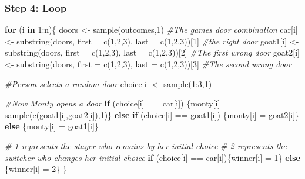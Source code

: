 \documentclass[
]{book}
\newenvironment{Shaded}{\begin{snugshade}}{\end{snugshade}}
\newcommand{\AttributeTok}[1]{\textcolor[rgb]{0.77,0.63,0.00}{#1}}
\newcommand{\CommentTok}[1]{\textcolor[rgb]{0.56,0.35,0.01}{\textit{#1}}}
\newcommand{\ControlFlowTok}[1]{\textcolor[rgb]{0.13,0.29,0.53}{\textbf{#1}}}
\newcommand{\DecValTok}[1]{\textcolor[rgb]{0.00,0.00,0.81}{#1}}
\newcommand{\FunctionTok}[1]{\textcolor[rgb]{0.00,0.00,0.00}{#1}}
\newcommand{\NormalTok}[1]{#1}
\newcommand{\OtherTok}[1]{\textcolor[rgb]{0.56,0.35,0.01}{#1}}
\newcommand{\SpecialCharTok}[1]{\textcolor[rgb]{0.00,0.00,0.00}{#1}}
\theoremstyle{definition}
\theoremstyle{definition}
\theoremstyle{definition}
\theoremstyle{definition}
\theoremstyle{remark}
\begin{document}
\hypertarget{step-4-loop}{%
\subsubsection*{Step 4: Loop}\label{step-4-loop}}

\begin{Shaded}
\begin{Highlighting}[]
\ControlFlowTok{for}\NormalTok{ (i }\ControlFlowTok{in} \DecValTok{1}\SpecialCharTok{:}\NormalTok{n)\{}
\NormalTok{  doors }\OtherTok{\textless{}{-}} \FunctionTok{sample}\NormalTok{(outcomes,}\DecValTok{1}\NormalTok{) }\CommentTok{\#The game\textquotesingle{}s door combination}
\NormalTok{  car[i] }\OtherTok{\textless{}{-}} \FunctionTok{substring}\NormalTok{(doors, }\AttributeTok{first =} \FunctionTok{c}\NormalTok{(}\DecValTok{1}\NormalTok{,}\DecValTok{2}\NormalTok{,}\DecValTok{3}\NormalTok{), }\AttributeTok{last =} \FunctionTok{c}\NormalTok{(}\DecValTok{1}\NormalTok{,}\DecValTok{2}\NormalTok{,}\DecValTok{3}\NormalTok{))[}\DecValTok{1}\NormalTok{] }\CommentTok{\#the right door}
\NormalTok{  goat1[i] }\OtherTok{\textless{}{-}} \FunctionTok{substring}\NormalTok{(doors, }\AttributeTok{first =} \FunctionTok{c}\NormalTok{(}\DecValTok{1}\NormalTok{,}\DecValTok{2}\NormalTok{,}\DecValTok{3}\NormalTok{), }\AttributeTok{last =} \FunctionTok{c}\NormalTok{(}\DecValTok{1}\NormalTok{,}\DecValTok{2}\NormalTok{,}\DecValTok{3}\NormalTok{))[}\DecValTok{2}\NormalTok{] }\CommentTok{\#The first wrong door}
\NormalTok{  goat2[i] }\OtherTok{\textless{}{-}} \FunctionTok{substring}\NormalTok{(doors, }\AttributeTok{first =} \FunctionTok{c}\NormalTok{(}\DecValTok{1}\NormalTok{,}\DecValTok{2}\NormalTok{,}\DecValTok{3}\NormalTok{), }\AttributeTok{last =} \FunctionTok{c}\NormalTok{(}\DecValTok{1}\NormalTok{,}\DecValTok{2}\NormalTok{,}\DecValTok{3}\NormalTok{))[}\DecValTok{3}\NormalTok{] }\CommentTok{\#The second wrong door}
  
  \CommentTok{\#Person selects a random door}
\NormalTok{  choice[i] }\OtherTok{\textless{}{-}} \FunctionTok{sample}\NormalTok{(}\DecValTok{1}\SpecialCharTok{:}\DecValTok{3}\NormalTok{,}\DecValTok{1}\NormalTok{)}
  
  \CommentTok{\#Now Monty opens a door}
  \ControlFlowTok{if}\NormalTok{ (choice[i] }\SpecialCharTok{==}\NormalTok{ car[i])}
\NormalTok{    \{monty[i] }\OtherTok{=} \FunctionTok{sample}\NormalTok{(}\FunctionTok{c}\NormalTok{(goat1[i],goat2[i]),}\DecValTok{1}\NormalTok{)\}}
  \ControlFlowTok{else} \ControlFlowTok{if}\NormalTok{ (choice[i] }\SpecialCharTok{==}\NormalTok{ goat1[i])}
\NormalTok{    \{monty[i] }\OtherTok{=}\NormalTok{ goat2[i]\}}
  \ControlFlowTok{else}
\NormalTok{    \{monty[i] }\OtherTok{=}\NormalTok{ goat1[i]\}}

  \CommentTok{\# 1 represents the stayer who remains by her initial choice}
  \CommentTok{\# 2 represents the switcher who changes her initial choice}
  \ControlFlowTok{if}\NormalTok{ (choice[i] }\SpecialCharTok{==}\NormalTok{ car[i])\{winner[i] }\OtherTok{=} \DecValTok{1}\NormalTok{\} }\ControlFlowTok{else}\NormalTok{ \{winner[i] }\OtherTok{=} \DecValTok{2}\NormalTok{\}}
\NormalTok{\}}
\end{Highlighting}
\end{Shaded}
\end{document}
